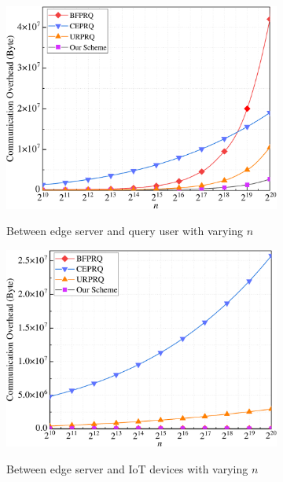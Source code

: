 \documentclass[IEEE JOURNAL OF BIOMEDICAL AND HEALTH INFORMATICS]{IEEEtran}
\begin{document}
\begin{figure}%
	\centering
	\begin{subfigure}[t]{0.23\textwidth}
		\centering
		\includegraphics[width=1\textwidth]{commu_1n}\\
		\caption{Between edge server and query user with varying $n$}\label{commu_1n}	
	\end{subfigure}
	\quad
	\begin{subfigure}[t]{0.23\textwidth}
		\centering
		\includegraphics[width=1\textwidth]{commu_3n}\\
		\caption{Between edge server and IoT devices with varying $n$}\label{commu_3n}
	\end{subfigure}
	\quad
	\begin{subfigure}[t]{0.23\textwidth}

\end{subfigure}
\end{figure}
\end{document}

